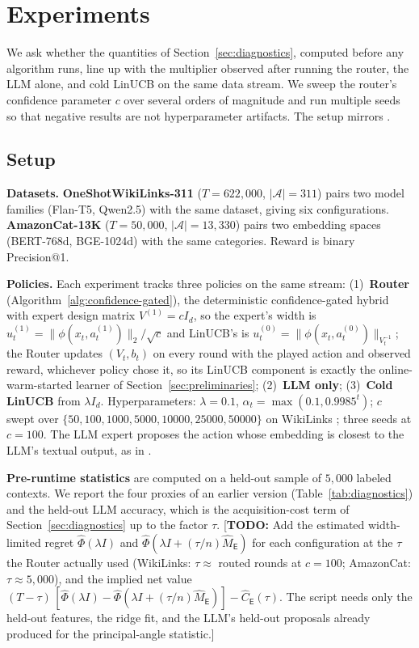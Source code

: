 \documentclass{article}
\theoremstyle{definition}
\theoremstyle{remark}
\theoremstyle{remark}
\newcommand{\todo}[1]{\textcolor{red!70!black}{[\textbf{TODO:} #1]}}
\newcommand{\Exp}{\mathsf{E}}
\begin{document}
\section{Experiments}
\label{sec:experiments}

We ask whether the quantities of Section~\ref{sec:diagnostics}, computed
before any algorithm runs, line up with the multiplier observed after running
the router, the LLM alone, and cold LinUCB on the same data stream. We sweep
the router's confidence parameter $c$ over several orders of magnitude and run
multiple seeds so that negative results are not hyperparameter artifacts. The
setup mirrors \cite{chen2024llmdecision}.

\subsection{Setup}
\label{sec:exp-setup}

\textbf{Datasets.} \textbf{OneShotWikiLinks-311} ($T\!=\!622{,}000$,
$|\mathcal A|\!=\!311$) pairs two model families (Flan-T5, Qwen2.5) with the
same dataset, giving six configurations. \textbf{AmazonCat-13K}
($T\!=\!50{,}000$, $|\mathcal A|\!=\!13{,}330$) pairs two embedding spaces
(BERT-768d, BGE-1024d) with the same categories. Reward is binary
Precision@1.

\textbf{Policies.} Each experiment tracks three policies on the same stream:
(1)~\textbf{Router} (Algorithm~\ref{alg:confidence-gated}), the deterministic
confidence-gated hybrid with expert design matrix $V^{(1)}=cI_d$, so the
expert's width is $u_t^{(1)}=\|\phi(x_t,a_t^{(1)})\|_2/\sqrt c$ and LinUCB's is
$u_t^{(0)}=\|\phi(x_t,a_t^{(0)})\|_{V_t^{-1}}$; the Router updates $(V_t,b_t)$ on
every round with the played action and observed reward, whichever policy
chose it, so its LinUCB component is exactly the online-warm-started learner
of Section~\ref{sec:preliminaries}; (2)~\textbf{LLM only}; (3)~\textbf{Cold
LinUCB} from $\lambda I_d$. Hyperparameters: $\lambda=0.1$,
$\alpha_t=\max(0.1,0.9985^t)$; $c$ swept over
$\{50,100,1000,5000,10000,25000,50000\}$ on WikiLinks
; three seeds at $c=100$.
The LLM expert proposes the action whose embedding is closest to the LLM's
textual output, as in \cite{chen2024llmdecision}.

\textbf{Pre-runtime statistics} are computed on a held-out sample of
$5{,}000$ labeled contexts. We report the four proxies of an earlier version
(Table~\ref{tab:diagnostics}) and the held-out LLM accuracy, which is the
acquisition-cost term of Section~\ref{sec:diagnostics} up to the factor
$\tau$. \todo{Add the estimated width-limited regret $\widehat\Phi(\lambda I)$
and $\widehat\Phi(\lambda I+(\tau/n)\widehat M_{\Exp})$ for each configuration
at the $\tau$ the Router actually used (WikiLinks: $\tau\approx$ routed rounds
at $c=100$; AmazonCat: $\tau\approx5{,}000$), and the implied net value
$(T-\tau)\,[\widehat\Phi(\lambda I)-\widehat\Phi(\lambda I+(\tau/n)\widehat M_{\Exp})]-\widehat C_{\Exp}(\tau)$.
The script needs only the held-out features, the ridge fit, and the LLM's
held-out proposals already produced for the principal-angle statistic.}
\end{document}
